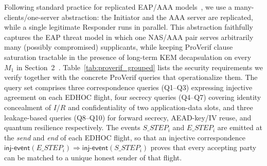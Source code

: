 \documentclass{easychair}
\newcommand{\VarSec}[1]{Section~#1~\cite{pq-edhoc-draft}}
\begin{document}
Following standard practice for replicated EAP/AAA
models~\cite{NSB21,JKK+23}, we use a many-clients/one-server
abstraction: the Initiator and the AAA server are replicated, while a
single legitimate Responder runs in parallel. This abstraction
faithfully captures the EAP threat model in which one NAS/AAA pair
serves arbitrarily many (possibly compromised) supplicants, while
keeping ProVerif clause saturation tractable in the presence of
long-term KEM decapsulation on every $M_1$ in \VarSec{2}.
Table~\ref{tab:proverif_grouped} lists the security requirements we
verify together with the concrete ProVerif queries that operationalize
them. The query set comprises three correspondence queries (Q1--Q3)
expressing injective agreement on each EDHOC flight, four secrecy
queries (Q4--Q7) covering identity concealment of $I$/$R$ and
confidentiality of two application-data slots, and three leakage-based
queries (Q8--Q10) for forward secrecy, AEAD-key/IV reuse, and quantum
resilience respectively. The events $S\_STEP_i$ and $E\_STEP_i$ are
emitted at the \emph{send} and \emph{end} of each EDHOC flight, so
that an injective correspondence
$\mathsf{inj\text{-}event}(E\_STEP_i)\Rightarrow
\mathsf{inj\text{-}event}(S\_STEP_i)$ proves that every accepting party
can be matched to a unique honest sender of that flight.
\end{document}

